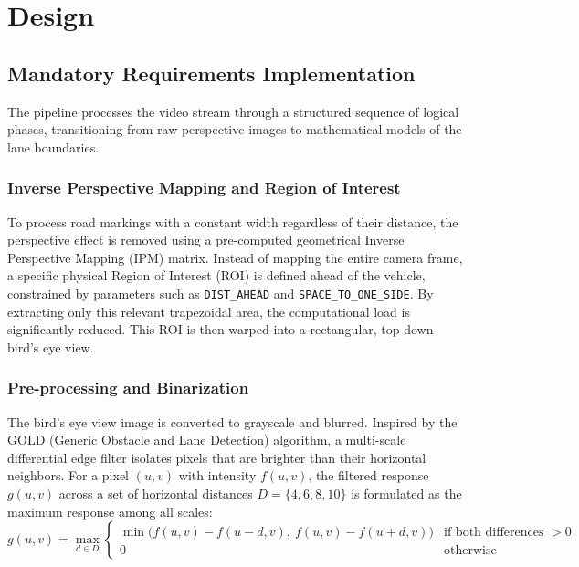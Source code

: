 \documentclass[12pt,a4paper]{article}
\begin{document}
\section{Design}

\subsection{Mandatory Requirements Implementation}
The pipeline processes the video stream through a structured sequence of logical phases, transitioning from raw perspective images to mathematical models of the lane boundaries.

\subsubsection{Inverse Perspective Mapping and Region of Interest}
To process road markings with a constant width regardless of their distance, the perspective effect is removed using a pre-computed geometrical Inverse Perspective Mapping (IPM) matrix. Instead of mapping the entire camera frame, a specific physical Region of Interest (ROI) is defined ahead of the vehicle, constrained by parameters such as \texttt{DIST\_AHEAD} and \texttt{SPACE\_TO\_ONE\_SIDE}. By extracting only this relevant trapezoidal area, the computational load is significantly reduced. This ROI is then warped into a rectangular, top-down bird's eye view.

\subsubsection{Pre-processing and Binarization}
The bird's eye view image is converted to grayscale and blurred. Inspired by the GOLD (Generic Obstacle and Lane Detection) algorithm, a multi-scale differential edge filter isolates pixels that are brighter than their horizontal neighbors. For a pixel $(u,v)$ with intensity $f(u,v)$, the filtered response $g(u,v)$ across a set of horizontal distances $D = \{4, 6, 8, 10\}$ is formulated as the maximum response among all scales:
\begin{equation}
    g(u,v) = \max_{d \in D} 
    \begin{cases} 
    \min\big(f(u,v) - f(u-d, v),\ f(u,v) - f(u+d, v)\big) & \text{if both differences } > 0 \\ 
    0 & \text{otherwise}
    \end{cases}
\end{equation}
\end{document}
